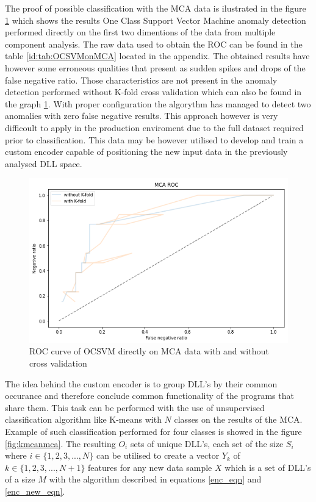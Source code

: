 \documentclass[a4paper,twoside,12pt]{book}
\begin{document}
The proof of possible classification with the MCA data is ilustrated in the figure \ref{fig:mcaroc} which shows the 
results One Class Support Vector Machine anomaly detection performed directly on the first two dimentions 
of the data from multiple component analysis. The raw data used to obtain the ROC can be found in the table
\ref{id:tab:OCSVMonMCA} located in the appendix. The obtained results have however some erroneous qualities that
present as sudden spikes and drops of the false negative ratio. Those characteristics are not present in the 
anomaly detection performed without K-fold cross validation which can also be found in the graph \ref{fig:mcaroc}. 
With proper configuration the algorythm has managed to detect 
two anomalies with zero false negative results. This approach however is very difficoult to apply in the 
production enviroment due to the full dataset required prior to classification. This data may be however 
utilised to develop and train a custom encoder capable of positioning the new input data in the previously 
analysed DLL space.  


 \begin{figure}
	\centering
	\includegraphics[scale=0.9]{images/MCAROCbothKFandNot.PNG}
	\caption{ROC curve of OCSVM directly on MCA data with and without cross validation}
	\label{fig:mcaroc}
 \end{figure}


The idea behind the custom encoder is to group DLL's by their common occurance and therefore
conclude common functionality of the programs that share them. This task can be performed
with the use of unsupervised classification algorithm like K-means with $\mathit{N}$ classes 
on the results of the MCA. Example of such classification
performed for four classes is showed in the figure \ref{fig:kmeanmca}. The resulting 
$\mathit{O_{i}}$ sets of unique DLL's, each set of the size $\mathit{S_{i}}$  where 
$\mathit{i\in\{1, 2, 3,..., N\}}$  can be utilised to create a 
vector $\mathit{Y_{k}}$ of $\mathit{k\in\{1, 2, 3, ..., N + 1\}}$ features for any new 
data sample $\mathit{X}$ which is a set of DLL's of a size $\mathit{M}$ with the algorithm
described in equations \ref{enc_eqn} and \ref{enc_new_eqn}. 
\end{document}
